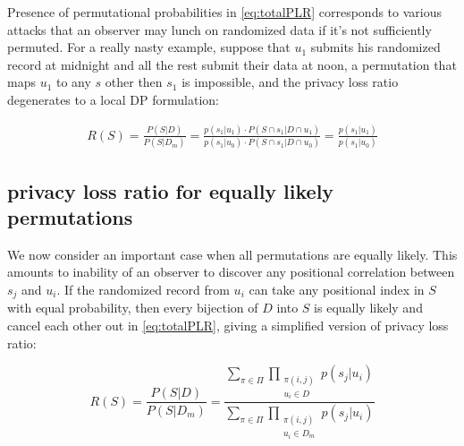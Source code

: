 \documentclass[11pt]{article}
\begin{document}
Presence of permutational probabilities in  \eqref{eq:totalPLR}  corresponds to various attacks that an observer may lunch on randomized data if it's not sufficiently permuted.   For a really nasty example, suppose that $u_1$ submits his randomized record at midnight and all the rest submit their data at noon, a permutation that maps $u_1$ to any $s$ other then $s_1$ is impossible, and the privacy loss ratio degenerates to a local DP formulation:

\begin{align}
R(S) = \frac{P(S|D)}{ P(S|D_m)} = \frac{p(s_1|u_1) \cdot P(S \cap s_1 | D \cap u_1)}  {p(s_1|u_0)  \cdot P(S \cap s_1 | D \cap u_0) } = \frac{p(s_1|u_1)}{p(s_1|u_0)}
\end{align}


\subsection{privacy loss ratio for equally likely permutations}

We now consider an important case when all permutations are equally likely.  This amounts to inability of an observer to discover any positional correlation between $s_j$ and $u_i$.  If the randomized record from $u_i$ can take any positional index in $S$ with equal probability, then every bijection of $D$ into $S$ is equally likely and cancel each other out in \eqref{eq:totalPLR}, giving  a simplified version of privacy loss ratio:

\begin{equation} \label{eq:mainPLR} 
R(S) =  \frac{P(S|D)}{ P(S|D_m)}  = \frac{\sum_{\pi \in \Pi} \prod_{\begin{matrix} \pi(i,j) \\ u_i \in D \end{matrix}}  p(s_j | u_i) } { \sum_{\pi \in \Pi}  \prod_{\begin{matrix} \pi(i,j) \\ u_i \in D_m \end{matrix}}   p(s_j | u_i) }
\end{equation}
\end{document}
